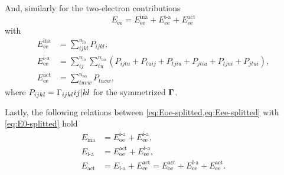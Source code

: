 And, similarly for the two-electron contributions
\begin{equation} \label{eq:Eee-splitted}
    E_{\text{ee}} = 
    E_{\text{ee}}^{\text{ina}} + E_{\text{ee}}^{\text{i-a}} + E_{\text{ee}}^{\text{act}}
\end{equation}
with
\begin{align}
    E_{\text{ee}}^{\text{ina}}
    &=
    \sum_{ijkl}^{n_{\text{io}}} 
    P_{ijkl}
    ,
    \\
    E_{\text{ee}}^{\text{i-a}}
    &=
    \sum_{ij}^{n_{\text{io}}} \sum_{tu}^{n_{\text{ao}}}
    \left( 
        P_{ijtu} +
        P_{tuij} +
        P_{tjiu} +
        P_{jtiu} +
        P_{tjui} +
        P_{jtui}
    \right)
    ,
    \\
    E_{\text{ee}}^{\text{act}}
    &=
    \sum_{tuvw}^{n_{\text{ao}}} 
    P_{tuvw}
    ,
\end{align}
where $P_{ijkl} = \sordm_{ijkl} \PBraket{ij | kl}$ for the symmetrized 
$ \boldsymbol{\mathrm{\Gamma}}$.

Lastly, the following relations between \cref{eq:Eoe-splitted,eq:Eee-splitted}
with \cref{eq:E0-splitted} hold 
\begin{align}
    E_{\text{ina}} &=
    E_{\text{oe}}^{\text{i-a}} + E_{\text{ee}}^{\text{i-a}}
    , \\
    E_{\text{i-a}} &= 
    E_{\text{oe}}^{\text{act}} + E_{\text{ee}}^{\text{i-a}}
    , \\
    E_{\text{act}} &= 
    E_{\text{i-a}} + E_{\text{ee}}^{\text{act}} =
    E_{\text{oe}}^{\text{act}} + E_{\text{ee}}^{\text{i-a}} + E_{\text{ee}}^{\text{act}}
    .
\end{align}
